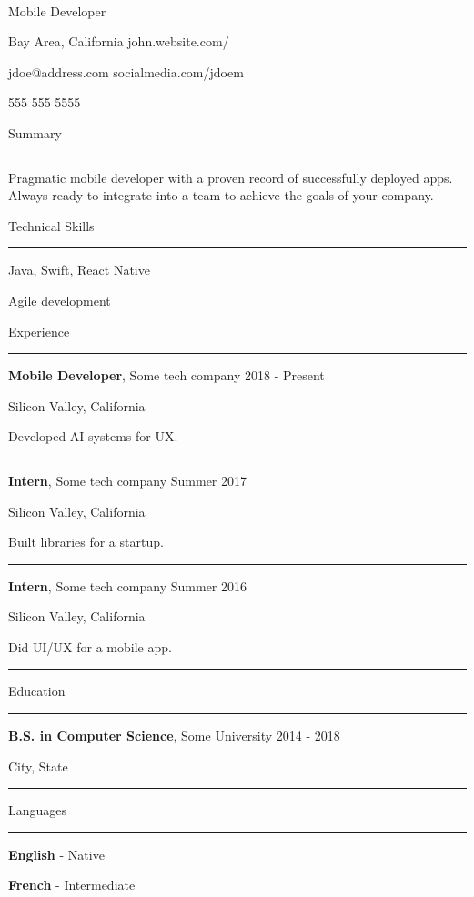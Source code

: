 \documentclass[12pt]{article}
\newcommand{\resumesection}[1]{
    {
        \color{accentcolor}
        \noindent
        \large{#1}
        \vspace{-8pt}

        \noindent
        \rule{\textwidth}{2pt}
    }
}
\newcommand{\info}[2]{
    {
        \color{secondarytext}
        \trivlist\nopagebreak
        \parindent0pt
        \item #1 \hspace{\fill} #2
        \item\relax\obeylines
    }
    \vspace{-5pt}
}
\newcommand{\job}[5]{
    \textbf{#2}, #3 \hspace{\fill} #1

    {\color{secondarytext}#4}

    #5

    \vspace{-5pt}
    {
        \color{secondaccentcolor}
        \rule{0.96\textwidth}{0.5pt}
    }

    \vspace{15pt}
}
\newcommand{\education}[4]{
    \textbf{#2}, #3 \hspace{\fill} #1

    {\color{secondarytext}#4}

    \vspace{-5pt}
    {
        \color{secondaccentcolor}
        \rule{0.96\textwidth}{0.5pt}
    }

    \vspace{15pt}
}
\newcommand{\languageprof}[2]{
    \raisebox{3pt}{$\centerdot$} \textbf{#1} - #2

    \vspace{5pt}
}
\newcommand{\closerlist}[1]{
    \raisebox{3pt}{$\centerdot$} #1

    \vspace{5pt}
}
\begin{document}
\begin{center}
     \\
    \vspace{0.25cm}
    \Large{Mobile Developer}
\end{center}

\info{Bay Area, California}{john.website.com/}
\info{jdoe@address.com}{socialmedia.com/jdoem}
\info{555 555 5555}{}

\vspace{12pt}
\resumesection{Summary}

\hangindent=15pt
Pragmatic mobile developer with a proven record of successfully deployed apps. Always ready to integrate into a team to achieve the goals of your company.

\vspace{12pt}
\resumesection{Technical Skills}

\closerlist{Java, Swift, React Native}
\closerlist{Agile development}

\vspace{8pt}
\resumesection{Experience}

\job{2018 - Present}{Mobile Developer}{Some tech company}{Silicon Valley, California}{\hangindent=15pt Developed AI systems for UX.}

\job{Summer 2017}{Intern}{Some tech company}{Silicon Valley, California}{\hangindent=15pt Built libraries for a startup.}

\job{Summer 2016}{Intern}{Some tech company}{Silicon Valley, California}{\hangindent=15pt Did UI/UX for a mobile app.}

\resumesection{Education}

\education{2014 - 2018}{B.S. in Computer Science}{Some University}{City, State}

\resumesection{Languages}

\languageprof{English}{Native}
\languageprof{French}{Intermediate}
\end{document}
